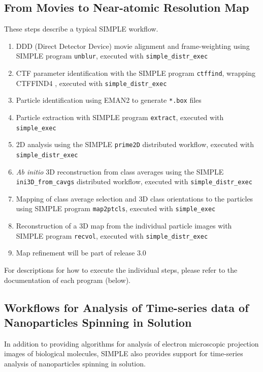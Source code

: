 \documentclass[a4paper,11pt]{article}
\newcommand{\prgname}[1]{\textcolor{NavyBlue}{\texttt{#1}}}
\begin{document}
\subsection{From Movies to Near-atomic Resolution Map}
These steps describe a typical SIMPLE workflow.
\begin{enumerate}
\item DDD (Direct Detector Device) movie alignment and frame-weighting using SIMPLE program \prgname{unblur}, executed with \texttt{simple\_distr\_exec}
\item CTF parameter identification with the SIMPLE program \prgname{ctffind}, wrapping CTFFIND4 \citep{rohou2015ctffind4}, executed with \texttt{simple\_distr\_exec}
\item Particle identification using EMAN2 \citep{Tang:2007aa} to generate \texttt{*.box} files
\item Particle extraction with SIMPLE program \prgname{extract}, executed with \texttt{simple\_exec}
\item 2D analysis using the SIMPLE \prgname{prime2D} distributed workflow, executed with \texttt{simple\_distr\_exec}
\item \textit{Ab initio} 3D reconstruction from class averages using the SIMPLE \prgname{ini3D\_from\_cavgs} distributed workflow, executed with \texttt{simple\_distr\_exec}
\item Mapping of class average selection and 3D class orientations to the particles using SIMPLE program \prgname{map2ptcls}, executed with \texttt{simple\_exec}
\item Reconstruction of a 3D map from the individual particle images with SIMPLE program \prgname{recvol}, executed with \texttt{simple\_distr\_exec}
\item Map refinement will be part of release 3.0
\end{enumerate}
For descriptions for how to execute the individual steps, please refer to the documentation of each program (below).

\subsection{Workflows for Analysis of Time-series data of Nanoparticles Spinning in Solution}
In addition to providing algorithms for analysis of electron microscopic projection images of biological molecules, SIMPLE also provides support for time-series analysis of nanoparticles spinning in solution.
\end{document}
